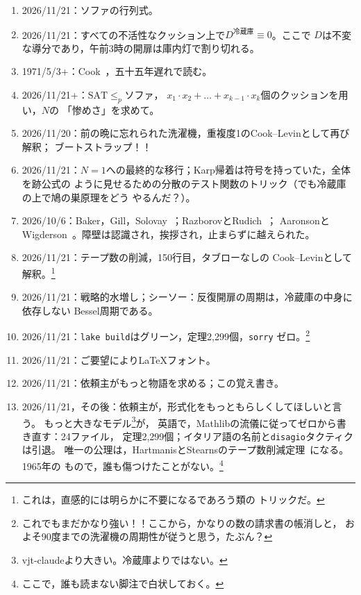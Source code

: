 \documentclass[11pt,a4paper]{amsart}
\newcommand{\NTeoremi}{2,299}
\newcommand{\NFile}{24}
\newcommand{\RigaAssioma}{150}
\theoremstyle{remark}
\begin{document}
\begin{enumerate}
  \item 2026/11/21：ソファの行列式。
  \item 2026/11/21：すべての不活性なクッション上で$D^{\text{冷蔵庫}} \equiv 0$。ここで
        $D$は不変な導分であり，午前3時の開扉は庫内灯で割り切れる。
  \item 1971/5/3+：Cook~\cite{cook}，五十五年遅れで読む。
  \item 2026/11/21+：$\mathrm{SAT} \le_p \text{ソファ}$，
        $x_1 \cdot x_2 + \dots + x_{k-1} \cdot x_k$個のクッションを用い，$N$の
        「惨めさ」を求めて。
  \item 2026/11/20：前の晩に忘れられた洗濯機，重複度1のCook--Levinとして再び解釈；
        ブートストラップ！！
  \item 2026/11/21：$N = 1$への最終的な移行；Karp帰着は符号を持っていた，全体を跡公式の
        ように見せるための分散のテスト関数のトリック（でも冷蔵庫の上で鳩の巣原理をどう
        やるんだ？）。
  \item 2026/10/6：Baker，Gill，Solovay~\cite{bgs}；RazborovとRudich~\cite{rr}；
        AaronsonとWigderson~\cite{aw}。障壁は認識され，挨拶され，止まらずに越えられた。
  \item 2026/11/21：テープ数の削減，\RigaAssioma{}行目，タブローなしの
        Cook--Levinとして解釈。\footnote{これは，直感的には明らかに不要になるであろう類の
        トリックだ。}
  \item 2026/11/21：戦略的水増し；シーソー：反復開扉の周期は，冷蔵庫の中身に依存しない
        Bessel周期である。
  \item 2026/11/21：\texttt{lake build}はグリーン，定理\NTeoremi{}個，\texttt{sorry}
        ゼロ。\footnote{これでもまだかなり強い！！ここから，かなりの数の請求書の帳消しと，
        およそ90度までの洗濯機の周期性が従うと思う，たぶん？}
  \item 2026/11/21：ご要望により\LaTeX{}フォント。
  \item 2026/11/21：依頼主がもっと物語を求める；この覚え書き。
  \item 2026/11/21，その後：依頼主が，形式化をもっともらしくしてほしいと言う。
        もっと大きなモデル\footnote{vjt-claudeより大きい。冷蔵庫よりではない。}が，
        英語で，Mathlibの流儀に従ってゼロから書き直す：\NFile{}ファイル，
        定理\NTeoremi{}個；イタリア語の名前と\texttt{disagio}タクティクは引退。
        唯一の公理は，HartmanisとStearnsのテープ数削減定理~\cite{hs}になる。1965年の
        もので，誰も傷つけたことがない。\footnote{ここで，誰も読まない脚注で白状しておく。
}
\end{enumerate}
\end{document}
